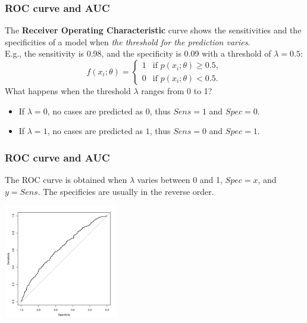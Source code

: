 \begin{frame}
\frametitle{ROC curve and AUC}
The {\bf Receiver Operating Characteristic} curve shows the sensitivities and the specificities of a model when {\it the threshold for the prediction varies}.\\
\vspace{0.3cm}
E.g., the sensitivity is 0.98, and the specificity is 0.09 with a threshold of $\lambda=0.5$: 
$$
f(x_i;\theta)=
\left\{\begin{array}{ll}
1 & \mbox{if } p(x_i;\theta) \geq 0.5,\\
0& \mbox{if } p(x_i;\theta) < 0.5.
\end{array}
\right.
$$ 
What happens when the threshold $\lambda$ ranges from 0 to 1?
\begin{itemize}
\item If $\lambda=0$, no cases are predicted as $0$, thus $Sens=1$ and $Spec=0$.
\item If $\lambda=1$, no cases are predicted as $1$, thus $Sens=0$ and $Spec=1$.
\end{itemize}
\end{frame}
\begin{frame}
\frametitle{ROC curve and AUC}
The ROC curve is obtained when $\lambda$ varies between 0 and 1, $Spec=x$, and $y=Sens$. The specificies are usually in the reverse order.
\begin{center}
\includegraphics[width=5cm]{../Graphs/ROC_curve.pdf}
\end{center}
\end{frame}
